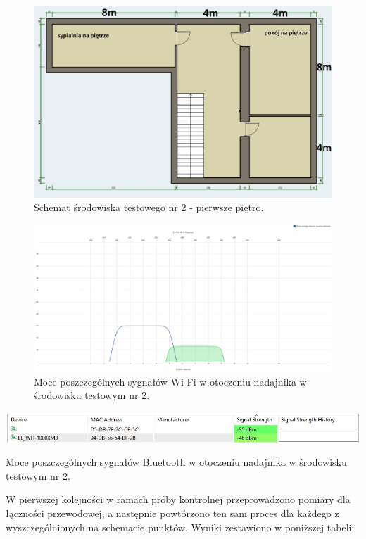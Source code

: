 \documentclass[12pt, twoside, openany]{mwrep}
\begin{document}
\begin{figure}[H]
\centering
\includegraphics[scale=0.4]{dom2pietro}
\caption{Schemat środowiska testowego nr 2 - pierwsze piętro.}
\end{figure}
\begin{figure}[H]
\centering
\includegraphics[scale=0.35]{2,4Ghz_Dom}
\caption{Moce poszczególnych sygnałów Wi-Fi w otoczeniu nadajnika w środowisku testowym nr 2.}
\end{figure}
\begin{table}[H]
\centering
\includegraphics[scale=0.8]{bt_dom}
\caption{Moce poszczególnych sygnałów Bluetooth w otoczeniu nadajnika w środowisku testowym nr 2.}
\end{table}
W pierwszej kolejności w ramach próby kontrolnej przeprowadzono pomiary dla łączności przewodowej, a następnie powtórzono ten sam proces dla każdego z wyszczególnionych na schemacie punktów. Wyniki zestawiono w poniższej tabeli:
\end{document}

